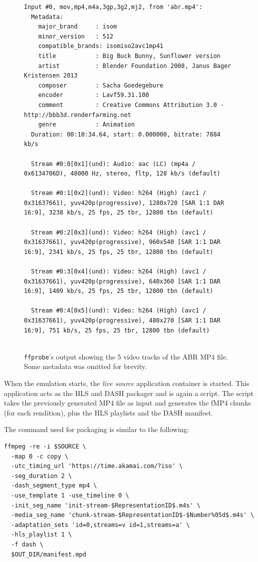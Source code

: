 \begin{figure}[h]
    \centering
    \begin{verbatim}
Input #0, mov,mp4,m4a,3gp,3g2,mj2, from 'abr.mp4':
  Metadata:
    major_brand     : isom
    minor_version   : 512
    compatible_brands: isomiso2avc1mp41
    title           : Big Buck Bunny, Sunflower version
    artist          : Blender Foundation 2008, Janus Bager Kristensen 2013
    composer        : Sacha Goedegebure
    encoder         : Lavf59.31.100
    comment         : Creative Commons Attribution 3.0 - http://bbb3d.renderfarming.net
    genre           : Animation
  Duration: 00:10:34.64, start: 0.000000, bitrate: 7884 kb/s
  
  Stream #0:0[0x1](und): Audio: aac (LC) (mp4a / 0x6134706D), 48000 Hz, stereo, fltp, 128 kb/s (default)
  
  Stream #0:1[0x2](und): Video: h264 (High) (avc1 / 0x31637661), yuv420p(progressive), 1280x720 [SAR 1:1 DAR 16:9], 3238 kb/s, 25 fps, 25 tbr, 12800 tbn (default)
  
  Stream #0:2[0x3](und): Video: h264 (High) (avc1 / 0x31637661), yuv420p(progressive), 960x540 [SAR 1:1 DAR 16:9], 2341 kb/s, 25 fps, 25 tbr, 12800 tbn (default)
  
  Stream #0:3[0x4](und): Video: h264 (High) (avc1 / 0x31637661), yuv420p(progressive), 640x360 [SAR 1:1 DAR 16:9], 1409 kb/s, 25 fps, 25 tbr, 12800 tbn (default)
  
  Stream #0:4[0x5](und): Video: h264 (High) (avc1 / 0x31637661), yuv420p(progressive), 480x270 [SAR 1:1 DAR 16:9], 751 kb/s, 25 fps, 25 tbr, 12800 tbn (default)
  
    \end{verbatim}
    \caption{\texttt{ffprobe}'s output showing the 5 video tracks of the ABR MP4 file. Some metadata was omitted for brevity.}
    \label{fig:ffprobe_abr}
\end{figure}

When the emulation starts, the \textit{live source} application container is started. This application acts as the HLS and DASH packager and is again a \ffmpeg{} script. The script takes the previously generated MP4 file as input and generates the fMP4 chunks (for each rendition), plus the HLS playlists and the DASH manifest.

The \ffmpeg{} command used for packaging is similar to the following:

\begin{verbatim}
ffmpeg -re -i $SOURCE \
  -map 0 -c copy \
  -utc_timing_url 'https://time.akamai.com/?iso' \
  -seg_duration 2 \
  -dash_segment_type mp4 \
  -use_template 1 -use_timeline 0 \
  -init_seg_name 'init-stream-$RepresentationID$.m4s' \
  -media_seg_name 'chunk-stream-$RepresentationID$-$Number%05d$.m4s' \
  -adaptation_sets 'id=0,streams=v id=1,streams=a' \
  -hls_playlist 1 \
  -f dash \
  $OUT_DIR/manifest.mpd
\end{verbatim}

